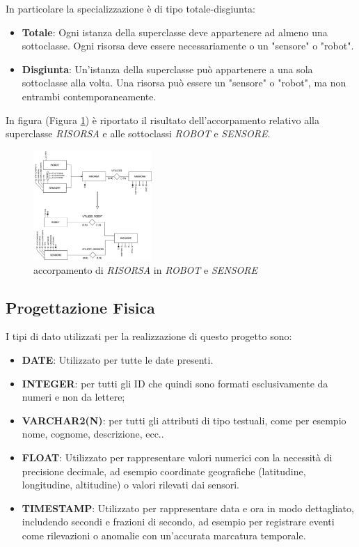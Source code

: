 \noindent
In particolare la specializzazione è di tipo totale-disgiunta:
\begin{itemize}
    \item \textbf{Totale}: Ogni istanza della superclasse deve appartenere ad almeno una sottoclasse. Ogni risorsa deve essere necessariamente o un "sensore" o "robot".
    \item \textbf{Disgiunta}: Un'istanza della superclasse può appartenere a una sola sottoclasse alla volta. Una risorsa può essere un "sensore" o "robot", ma non entrambi contemporaneamente.
\end{itemize}

\noindent
In figura (Figura \ref{fig:specializzazione}) è riportato il risultato dell'accorpamento relativo alla superclasse \textit{RISORSA} e alle sottoclassi \textit{ROBOT} e \textit{SENSORE}.

\begin{figure}[h!]
    \centering
    \includegraphics[width=0.4\textwidth]{Media/Generalizzazione_Specializzazione.png}
    \caption{accorpamento di \textit{RISORSA} in \textit{ROBOT} e \textit{SENSORE}}
    \label{fig:specializzazione}
\end{figure}

\subsection{Progettazione Fisica}

I tipi di dato utilizzati per la realizzazione di questo progetto sono:

\begin{itemize}
    \item \textbf{DATE}: Utilizzato per tutte le date presenti.
    \item \textbf{INTEGER}: per tutti gli ID che quindi sono formati esclusivamente da numeri e non da lettere;
    \item \textbf{VARCHAR2(N)}: per tutti gli attributi di tipo testuali, come per esempio nome, cognome, descrizione, ecc..
    \item \textbf{FLOAT}: Utilizzato per rappresentare valori numerici con la necessità di precisione decimale, ad esempio coordinate geografiche (latitudine, longitudine, altitudine) o valori rilevati dai sensori.
    \item \textbf{TIMESTAMP}: Utilizzato per rappresentare data e ora in modo dettagliato, includendo secondi e frazioni di secondo, ad esempio per registrare eventi come rilevazioni o anomalie con un’accurata marcatura temporale.
\end{itemize}


